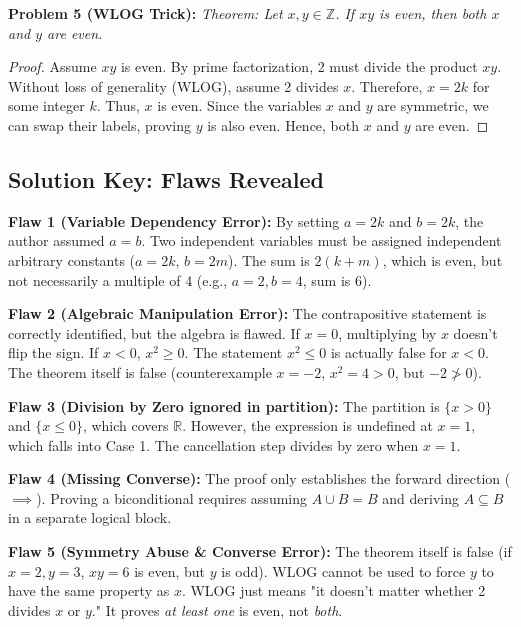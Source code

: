 \documentclass[11pt, letterpaper]{article}
\theoremstyle{definition}
\theoremstyle{remark}
\newcommand{\Z}{\mathbb{Z}}
\newcommand{\R}{\mathbb{R}}
\begin{document}
\textbf{Problem 5 (WLOG Trick):}
\textit{Theorem: Let $x,y \in \Z$. If $xy$ is even, then both $x$ and $y$ are even.}
\begin{proof}
Assume $xy$ is even. By prime factorization, 2 must divide the product $xy$. 
Without loss of generality (WLOG), assume 2 divides $x$. 
Therefore, $x = 2k$ for some integer $k$. Thus, $x$ is even. 
Since the variables $x$ and $y$ are symmetric, we can swap their labels, proving $y$ is also even. 
Hence, both $x$ and $y$ are even.
\end{proof}

\vspace{2cm}

\subsection{Solution Key: Flaws Revealed}

\textbf{Flaw 1 (Variable Dependency Error):} By setting $a=2k$ and $b=2k$, the author assumed $a=b$. Two independent variables must be assigned independent arbitrary constants ($a=2k$, $b=2m$). The sum is $2(k+m)$, which is even, but not necessarily a multiple of 4 (e.g., $a=2, b=4$, sum is 6).

\textbf{Flaw 2 (Algebraic Manipulation Error):} The contrapositive statement is correctly identified, but the algebra is flawed. If $x=0$, multiplying by $x$ doesn't flip the sign. If $x < 0$, $x^2 \ge 0$. The statement $x^2 \le 0$ is actually false for $x < 0$. The theorem itself is false (counterexample $x=-2$, $x^2=4>0$, but $-2 \ngtr 0$).

\textbf{Flaw 3 (Division by Zero ignored in partition):} The partition is $\{x > 0\}$ and $\{x \le 0\}$, which covers $\R$. However, the expression is undefined at $x=1$, which falls into Case 1. The cancellation step divides by zero when $x=1$.

\textbf{Flaw 4 (Missing Converse):} The proof only establishes the forward direction ($\implies$). Proving a biconditional requires assuming $A \cup B = B$ and deriving $A \subseteq B$ in a separate logical block. 

\textbf{Flaw 5 (Symmetry Abuse & Converse Error):} The theorem itself is false (if $x=2, y=3$, $xy=6$ is even, but $y$ is odd). WLOG cannot be used to force $y$ to have the same property as $x$. WLOG just means "it doesn't matter whether 2 divides $x$ or $y$." It proves \textit{at least one} is even, not \textit{both}.
\end{document}

